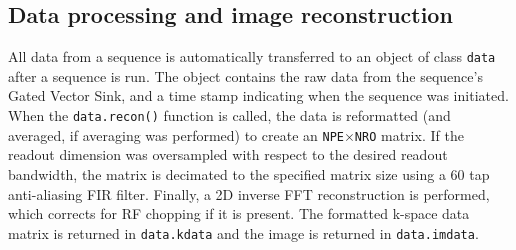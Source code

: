 \documentclass[10pt,letterpaper]{article}
\begin{document}
\subsection*{Data processing and image reconstruction}
All data from a sequence is automatically transferred to an object of class \texttt{data} after a sequence is run.
The object contains the raw data from the sequence's Gated Vector Sink, 
and a time stamp indicating when the sequence was initiated.
When the \texttt{data.recon()} function is called, the data is reformatted (and averaged, if 
averaging was performed) to create an \texttt{NPE}$\times$\texttt{NRO} matrix. If the 
readout dimension was oversampled with respect to the desired readout bandwidth, the 
matrix is decimated to the specified matrix size using a 60 tap anti-aliasing FIR
filter. Finally, a 2D inverse FFT reconstruction is performed, which corrects for RF 
chopping if it is present. The formatted k-space data matrix is returned in 
\texttt{data.kdata} and the image is returned in \texttt{data.imdata}.


\end{document}
